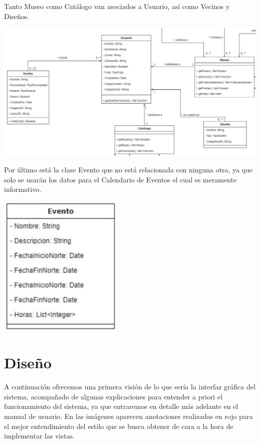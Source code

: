 	\bigskip
	
	Tanto Museo como Catálogo van asociados a Usuario, así como Vecinos y Diseños.
	
	\bigskip
	
	\includegraphics[width=\textwidth]{img/cap5/diagramaclases/usuario.jpg}
	
	\bigskip

	Por último está la clase Evento que no está relacionada con ninguna otra, ya que solo se usarán los datos para el Calendario de Eventos el cual es meramente informativo.
	
	\bigskip
	
	\begin{center}
		\includegraphics[width=6cm]{img/cap5/diagramaclases/evento.jpg}
	\end{center}

\clearpage

\section{Dise\~no}

A continuación ofrecemos una primera visión de lo que sería la interfaz gráfica del sistema, acompañado de algunas explicaciones para entender a priori el funcionamiento  del sistema, ya que entraremos en detalle más adelante en el manual de usuario. En las imágenes aparecen anotaciones realizadas en rojo para el mejor entendimiento del estilo que se busca obtener de cara a la hora de implementar las vistas.\\

